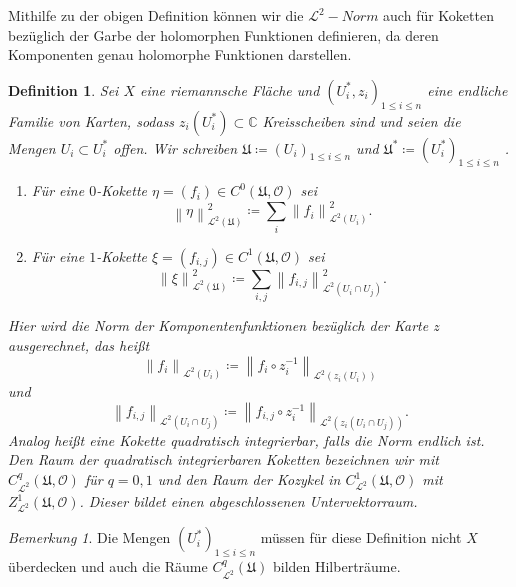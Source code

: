 \documentclass[11pt,a4paper,toc=bibliography]{scrartcl}
\theoremstyle{thm}
\theoremstyle{def}
\newtheorem{defi}{Definition}[section]
\theoremstyle{remark}
\newtheorem*{bem}{Bemerkung}
\newcommand{\norm}[1]{\left\lVert#1\right\rVert}
\begin{document}
Mithilfe zu der obigen Definition können wir die $\mathcal{L}^2-Norm$ auch für Koketten bezüglich der Garbe der holomorphen Funktionen definieren, da deren Komponenten genau holomorphe Funktionen darstellen.
\begin{defi}
Sei $X$ eine riemannsche Fläche und $\left( U_i^{*},z_i\right)_{1\leq i\leq n}$ eine endliche Familie von Karten, sodass $z_i(U_i^{*})\subset \mathbb{C}$ Kreisscheiben sind und seien die Mengen $U_i\subset U_i^{*}$ offen. Wir schreiben $\mathfrak{U}\coloneqq\left( U_i \right)_{1\leq i\leq n}$ und $\mathfrak{U}^{*}\coloneqq\left( U_i^{*}\right)_{1\leq i\leq n}$ .
\begin{enumerate}
\item
Für eine $0$-Kokette $\eta = (f_i)\in C^0(\mathfrak{U},\mathcal{O})$ sei
$$
\norm{\eta}_{\mathcal{L}^2(\mathfrak{U})}^2 \coloneqq \sum_i \norm{f_i}_{\mathcal{L}^2(U_i)}^2.
$$
\item
Für eine $1$-Kokette $\xi= (f_{i,j})\in C^1(\mathfrak{U,\mathcal{O}}) $ sei 
$$
\norm{\xi}_{\mathcal{L}^2 (\mathfrak{U})}^2\coloneqq \sum_{i,j} \norm{f_{i,j}}_{\mathcal{L}^2(U_i\cap U_j)}^2.
$$
\end{enumerate} 
Hier wird die Norm der Komponentenfunktionen bezüglich der Karte $z$ ausgerechnet, das heißt
$$
\norm{f_i}_{\mathcal{L}^2(U_i)} \coloneqq \norm{f_i\circ z_i^{-1}}_{\mathcal{L}^2(z_i(U_i))}
$$ 
und 
$$
\norm{f_{i,j}}_{\mathcal{L}^2(U_i\cap U_j)}\coloneqq \norm{f_{i,j}\circ z_i^{-1}}_{\mathcal{L}^2(z_i(U_i\cap U_j))}.
$$
Analog heißt eine Kokette \emph{quadratisch integrierbar}, falls die Norm endlich ist. \\Den Raum der quadratisch integrierbaren Koketten bezeichnen wir mit $C^q_{\mathcal{L}^2}(\mathfrak{U},\mathcal{O})$ für $q=0,1$ und den Raum der Kozykel in $C^1_{\mathcal{L}^2}(\mathfrak{U},\mathcal{O})$ mit $Z^1_{\mathcal{L}^2}(\mathfrak{U},\mathcal{O})$. Dieser bildet einen abgeschlossenen Untervektorraum.
\end{defi}
\begin{bem}
Die Mengen $(U^*_i)_{1\leq i\leq n }$ müssen für diese Definition nicht $X$ überdecken und auch die Räume $C^q_{\mathcal{L}^2}(\mathfrak{U})$ bilden Hilberträume.
\end{bem}
\end{document}
